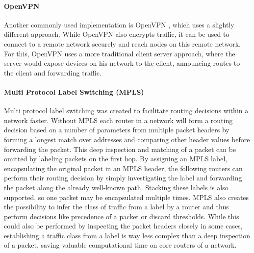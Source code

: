 \paragraph{OpenVPN} Another commonly used implementation is OpenVPN \cite{openvpn}, which uses a slightly different approach. While OpenVPN also encrypts traffic, it can be used to connect to a remote network securely and reach nodes on this remote network. For this, OpenVPN uses a more traditional client server approach, where the server would expose devices on his network to the client, announcing routes to the client and forwarding traffic.

\paragraph{Multi Protocol Label Switching (MPLS)}
\label{mpls}
Multi protocol label switching \cite{rfc3031} was created to facilitate routing decisions within a network faster. Without MPLS each router in a network will form a routing decision based on a number of parameters from multiple packet headers by forming a longest match over addresses and comparing other header values before forwarding the packet. This deep inspection and matching of a packet can be omitted by labeling packets on the first hop. By assigning an MPLS label, encapsulating the original packet in an MPLS header, the following routers can perform their routing decision by simply investigating the label and forwarding the packet along the already well-known path. Stacking these labels is also supported, so one packet may be encapsulated multiple times. MPLS also creates the possibility to infer the class of traffic from a label by a router and thus perform decisions like precedence of a packet or discard thresholds. While this could also be performed by inspecting the packet headers closely in some cases, establishing a traffic class from a label is way less complex than a deep inspection of a packet, saving valuable computational time on core routers of a network.
